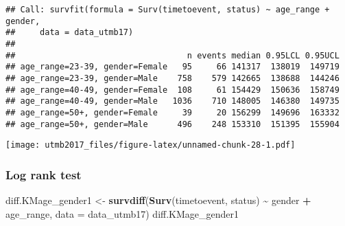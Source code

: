 \documentclass[
]{article}
\newenvironment{Shaded}{\begin{snugshade}}{\end{snugshade}}
\newcommand{\AttributeTok}[1]{\textcolor[rgb]{0.13,0.29,0.53}{#1}}
\newcommand{\DecValTok}[1]{\textcolor[rgb]{0.00,0.00,0.81}{#1}}
\newcommand{\FloatTok}[1]{\textcolor[rgb]{0.00,0.00,0.81}{#1}}
\newcommand{\FunctionTok}[1]{\textcolor[rgb]{0.13,0.29,0.53}{\textbf{#1}}}
\newcommand{\NormalTok}[1]{#1}
\newcommand{\OtherTok}[1]{\textcolor[rgb]{0.56,0.35,0.01}{#1}}
\newcommand{\SpecialCharTok}[1]{\textcolor[rgb]{0.81,0.36,0.00}{\textbf{#1}}}
\newcommand{\StringTok}[1]{\textcolor[rgb]{0.31,0.60,0.02}{#1}}
\begin{document}
\begin{verbatim}
## Call: survfit(formula = Surv(timetoevent, status) ~ age_range + gender, 
##     data = data_utmb17)
## 
##                                   n events median 0.95LCL 0.95UCL
## age_range=23-39, gender=Female   95     66 141317  138019  149719
## age_range=23-39, gender=Male    758    579 142665  138688  144246
## age_range=40-49, gender=Female  108     61 154429  150636  158749
## age_range=40-49, gender=Male   1036    710 148005  146380  149735
## age_range=50+, gender=Female     39     20 156299  149696  163332
## age_range=50+, gender=Male      496    248 153310  151395  155904
\end{verbatim}

\begin{Shaded}
\end{Shaded}

\texttt{[image: utmb2017\_files/figure-latex/unnamed-chunk-28-1.pdf]}

\hypertarget{log-rank-test}{%
\subsubsection{\texorpdfstring{Log rank test
}{Log rank test }}\label{log-rank-test}}

\begin{Shaded}
\begin{Highlighting}[]
\NormalTok{diff.KMage\_gender1 }\OtherTok{\textless{}{-}} \FunctionTok{survdiff}\NormalTok{(}\FunctionTok{Surv}\NormalTok{(timetoevent, status) }\SpecialCharTok{\textasciitilde{}}\NormalTok{ gender }\SpecialCharTok{+}\NormalTok{ age\_range, }\AttributeTok{data =}\NormalTok{ data\_utmb17)}
\NormalTok{diff.KMage\_gender1}
\end{Highlighting}
\end{Shaded}
\end{document}

